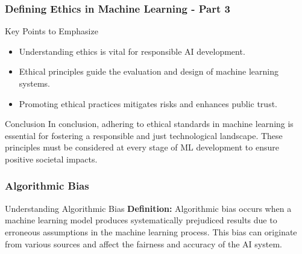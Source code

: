 \documentclass[aspectratio=169]{beamer}
\begin{document}
\begin{frame}[fragile]
    \frametitle{Defining Ethics in Machine Learning - Part 3}
    \begin{block}{Key Points to Emphasize}
        \begin{itemize}
            \item Understanding ethics is vital for responsible AI development.
            \item Ethical principles guide the evaluation and design of machine learning systems.
            \item Promoting ethical practices mitigates risks and enhances public trust.
        \end{itemize}
    \end{block}

    \begin{block}{Conclusion}
        In conclusion, adhering to ethical standards in machine learning is essential for fostering a responsible and just technological landscape. These principles must be considered at every stage of ML development to ensure positive societal impacts.
    \end{block}
\end{frame}

\begin{frame}[fragile]
    \frametitle{Algorithmic Bias}
    \begin{block}{Understanding Algorithmic Bias}
        \textbf{Definition:}  
        Algorithmic bias occurs when a machine learning model produces systematically prejudiced results due to erroneous assumptions in the machine learning process. This bias can originate from various sources and affect the fairness and accuracy of the AI system.
    \end{block}
    
\end{frame}
\end{document}
